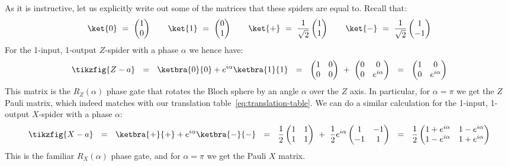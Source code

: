 \documentclass[a4paper,onecolumn,superscriptaddress,11pt,%
				unpublished,%
				allowfontchageintitle,%
				]{quantumarticle}
\begin{document}
As it is instructive, let us explicitly write out some of the matrices that these spiders are equal to.
Recall that:
\begin{equation*}
	\ket{0} \ = \ \begin{pmatrix}1\\ 0 \end{pmatrix} \quad\quad \ket{1} \ = \ \begin{pmatrix}0\\ 1 \end{pmatrix} \quad\quad \ket{+} \ = \ \frac{1}{\sqrt{2}}\begin{pmatrix}1\\ 1 \end{pmatrix} \quad\quad \ket{-} \ = \ \frac{1}{\sqrt{2}}\begin{pmatrix}1\\ -1 \end{pmatrix}
\end{equation*}
For the 1-input, 1-output $Z$-spider with a phase $\alpha$ we hence have:
\begin{equation}\label{eq:Z-a}
\tikzfig{Z-a} \ \ =\ \ \ketbra{0}{0} + e^{i \alpha} \ketbra{1}{1}
\ \ = \ \ \begin{pmatrix} 1 & 0 \\ 0& 0\end{pmatrix}\ +\ \begin{pmatrix} 0 & 0 \\ 0& e^{i\alpha}\end{pmatrix}\ \  =\ \  \begin{pmatrix} 1 & 0 \\ 0& e^{i\alpha}\end{pmatrix}
\end{equation}
This matrix is the $R_Z(\alpha)$ phase gate that rotates the Bloch sphere by an angle $\alpha$ over the $Z$ axis. 
In particular, for $\alpha=\pi$ we get the $Z$ Pauli matrix, which indeed matches with our translation table~\eqref{eq:translation-table}.
We can do a similar calculation for the 1-input, 1-output $X$-spider with a phase $\alpha$:
\begin{equation}\label{eq:X-a}
\tikzfig{X-a} \ \ =\ \ \ketbra{+}{+} + e^{i \alpha} \ketbra{-}{-}
\ \ = \ \ \frac12\begin{pmatrix} 1 & 1 \\ 1& 1\end{pmatrix}\ +\ \frac12 e^{i\alpha}\begin{pmatrix} 1 & -1 \\ -1& 1\end{pmatrix}\ \  =\ \  \frac12\begin{pmatrix} 1+e^{i\alpha}&   1-e^{i\alpha} \\ 1-e^{i\alpha} & 1+e^{i\alpha}\end{pmatrix}
\end{equation}
This is the familiar $R_X(\alpha)$ phase gate, and for $\alpha=\pi$ we get the Pauli $X$ matrix.
\end{document}
